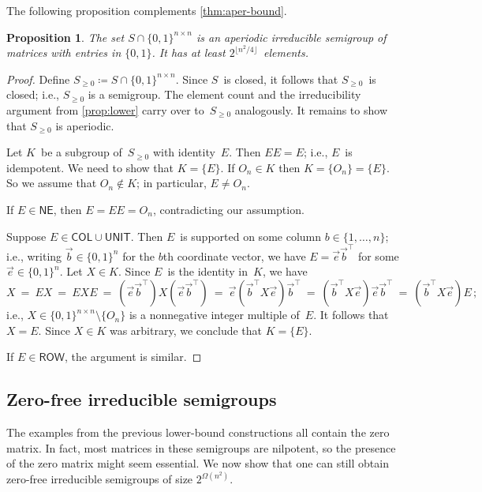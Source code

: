 \documentclass{lmcs}
\newtheorem{proposition}[thm]{Proposition}
\theoremstyle{definition}
\newcommand{\COL}{\mathsf{COL}}
\newcommand{\GL}{\mathrm{GL}}
\newcommand{\NE}{\mathsf{NE}}
\newcommand{\Q}{\mathbb{Q}}
\newcommand{\ROW}{\mathsf{ROW}}
\newcommand{\UNIT}{\mathsf{UNIT}}
\begin{document}

The following proposition complements \cref{thm:aper-bound}.
\begin{proposition} \label{prop:lower-nonnegative}
The set $S \cap \{0,1\}^{n \times n}$ is an aperiodic irreducible semigroup of matrices with entries in $\{0, 1\}$. It has at least $2^{\lfloor n^2/4 \rfloor}$~elements.
\end{proposition}
\begin{proof}
Define $S_{\ge 0} \coloneqq S \cap \{0,1\}^{n \times n}$.
Since $S$~is closed, it follows that $S_{\ge 0}$~is closed; i.e., $S_{\ge 0}$ is a semigroup.
The element count and the irreducibility argument from \cref{prop:lower} carry over to~$S_{\ge 0}$ analogously.
It remains to show that $S_{\ge 0}$ is aperiodic.

Let $K$~be a subgroup of~$S_{\ge 0}$ with identity~$E$.
Then $E E = E$; i.e., $E$~is idempotent.
We need to show that $K = \{E\}$.
If $O_n \in K$ then $K = \{O_n\} = \{E\}$.
So we assume that $O_n \not\in K$; in particular, $E \ne O_n$.

If $E \in \NE$, then $E = E E = O_n$, contradicting our assumption.

Suppose $E \in \COL \cup \UNIT$.
Then $E$~is supported on some column $b \in \{1, \ldots, n\}$; i.e., writing $\vec{b} \in \{0,1\}^n$ for the $b$th coordinate vector, we have $E = \vec{e} \vec{b}^\top$ for some $\vec{e} \in \{0,1\}^n$.
Let $X \in K$.
Since $E$~is the identity in~$K$,  we have
\[
 X \ = \ E X \ = \ E X E \ = \ (\vec{e} \vec{b}^\top) X (\vec{e} \vec{b}^\top) \ = \ \vec{e} (\vec{b}^\top X \vec{e}) \vec{b}^\top \ = \ (\vec{b}^\top X \vec{e}) \vec{e} \vec{b}^\top \ = \ (\vec{b}^\top X \vec{e}) E\,;
\]
i.e., $X \in \{0,1\}^{n \times n} \setminus \{O_n\}$ is a nonnegative integer multiple of~$E$.
It follows that $X = E$.
Since $X \in K$ was arbitrary, we conclude that $K = \{E\}$.

If $E \in \ROW$, the argument is similar.
\end{proof}

\subsection{Zero-free irreducible semigroups}\label{sub:lower-zero-free}
The examples from the previous lower-bound constructions all contain the zero matrix. In fact, most matrices in these semigroups are nilpotent, so the presence of the zero matrix might seem essential. We now show that one can still obtain zero-free irreducible semigroups of size $2^{\Omega(n^2)}$.
\end{document}
